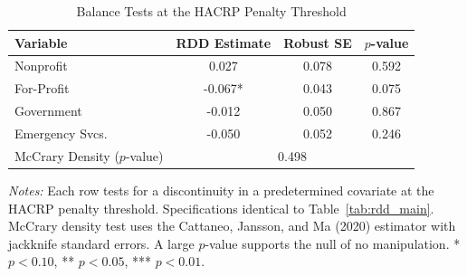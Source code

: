 \begin{table}[t]
\centering
\caption{Balance Tests at the HACRP Penalty Threshold}
\label{tab:balance}
\begin{threeparttable}
\begin{tabular}{lccc}
\toprule
Variable & RDD Estimate & Robust SE & $p$-value \\
\midrule
Nonprofit & 0.027 & 0.078 & 0.592 \\
For-Profit & -0.067* & 0.043 & 0.075 \\
Government & -0.012 & 0.050 & 0.867 \\
Emergency Svcs. & -0.050 & 0.052 & 0.246 \\
\midrule
McCrary Density ($p$-value) & \multicolumn{3}{c}{0.498} \\
\bottomrule
\end{tabular}
\begin{tablenotes}
\footnotesize
\item \textit{Notes:} Each row tests for a discontinuity in a predetermined covariate at the HACRP penalty threshold. Specifications identical to Table~\ref{tab:rdd_main}. McCrary density test uses the Cattaneo, Jansson, and Ma (2020) estimator with jackknife standard errors. A large $p$-value supports the null of no manipulation. * $p < 0.10$, ** $p < 0.05$, *** $p < 0.01$.
\end{tablenotes}
\end{threeparttable}
\end{table}
